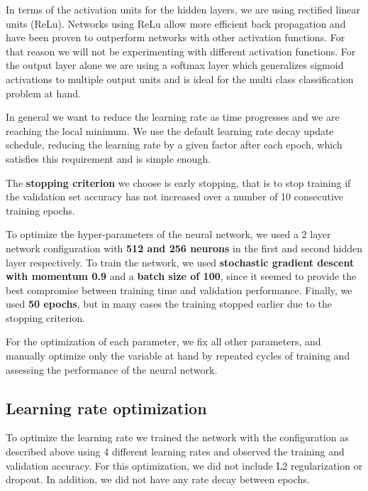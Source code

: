 \documentclass[12pt,twoside]{article}
\begin{document}
In terms of the activation units for the hidden layers, we are using rectified linear units (ReLu). Networks using ReLu allow more efficient back propagation and have been proven to outperform networks with other activation functions. For that reason we will not be experimenting with different activation functions. For the output layer alone we are using a softmax layer which generalizes sigmoid activations to multiple output units and is ideal for the multi class classification problem at hand.

In general we want to reduce the learning rate as time progresses and we are reaching the local minimum. We use the default learning rate decay update schedule, reducing the learning rate by a given factor after each epoch, which satisfies this requirement and is simple enough.


The \textbf{stopping criterion} we choose is early stopping, that is to stop training if the validation set accuracy has not increased over a number of 10 consecutive training epochs.


To optimize the hyper-parameters of the neural network, we used a 2 layer network configuration with \textbf{512 and 256 neurons} in the first and second hidden layer respectively. To train the network, we used \textbf{stochastic gradient descent with momentum 0.9} and a \textbf{batch size of 100}, since it seemed to provide the best compromise between training time and validation performance. Finally, we used \textbf{50 epochs}, but in many cases the training stopped earlier due to the stopping criterion. 
\newline

For the optimization of each parameter, we fix all other parameters, and manually optimize only the variable at hand by repeated cycles of training and assessing the performance of the neural network.
\subsection{Learning rate optimization}

To optimize the learning rate we trained the network with the configuration as described above  using 4 different learning rates and observed the training and validation accuracy. For this optimization, we did not include L2 regularization or dropout. In addition, we did not have any rate decay between epochs.
\end{document}
